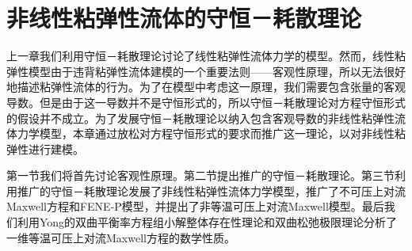  \chapter{非线性粘弹性流体的守恒－耗散理论}

% 
上一章我们利用守恒－耗散理论讨论了线性粘弹性流体力学的模型。然而，线性粘弹性模型由于违背粘弹性流体建模的一个重要法则——客观性原理，所以无法很好地描述粘弹性流体的行为\cite{oldroyd1950formulation,dimitrienko2010nonlinear,edwards1990remarks}。为了在模型中考虑这一原理，我们需要包含张量的客观导数。但是由于这一导数并不是守恒形式的，所以守恒－耗散理论对方程守恒形式的假设并不成立。为了发展守恒－耗散理论以纳入包含客观导数的非线性粘弹性流体力学模型，本章通过放松对方程守恒形式的要求而推广这一理论，以对非线性粘弹性进行建模。

第一节我们将首先讨论客观性原理。第二节提出推广的守恒－耗散理论。第三节利用推广的守恒－耗散理论发展了非线性粘弹性流体力学模型，推广了不可压上对流Maxwell方程和FENE-P模型，并提出了非等温可压上对流Maxwell模型。最后我们利用Yong的双曲平衡率方程组小解整体存在性理论和双曲松弛极限理论分析了一维等温可压上对流Maxwell方程的数学性质。

